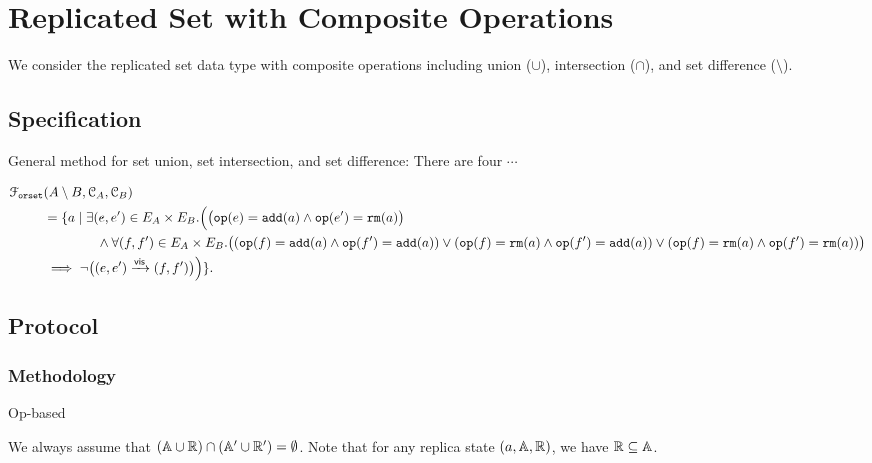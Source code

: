 \section{Replicated Set with Composite Operations}

We consider the replicated set data type with composite operations 
including union ($\cup$), intersection ($\cap$), and set difference ($\setminus$).

\subsection{Specification}	\label{ss:rset-composite-spec}

General method for set union, set intersection, and set difference:
There are four $\cdots$

\begin{align}
  \mathcal{F}_{\texttt{orset}}&(A \setminus B, \mathcal{C}_{A}, \mathcal{C}_{B}) \\
  &= \{ a \mid \exists (e, e') \in E_A \times E_B. 
  	\Big( \big(\texttt{op}(e) = \texttt{add}(a) \land \texttt{op}(e') = \texttt{rm}(a)\big) \\
      	    &\qquad\qquad \land \forall (f, f') \in E_A \times E_B. 
      	        \big( (\texttt{op}(f) = \texttt{add}(a) \land \texttt{op}(f') = \texttt{add}(a)) 
		      \lor (\texttt{op}(f) = \texttt{rm}(a) \land \texttt{op}(f') = \texttt{add}(a)) 
		      \lor (\texttt{op}(f) = \texttt{rm}(a) \land \texttt{op}(f') = \texttt{rm}(a)) 
		\big) \\
	    & \implies \lnot \big((e, e') \xrightarrow{\textsf{vis}} (f, f')\big)
	\Big)
	      \}.
\end{align}

\begin{example}
\end{example}

\subsection{Protocol}		\label{ss:rset-composite-protocol}

\subsubsection{Methodology}	\label{sss:rset-methodology}

Op-based

We always assume that $(\mathbb{A} \cup \mathbb{R}) \cap (\mathbb{A}' \cup \mathbb{R}') = \emptyset$.
Note that for any replica state $(a, \mathbb{A}, \mathbb{R})$, we have $\mathbb{R} \subseteq \mathbb{A}$.


